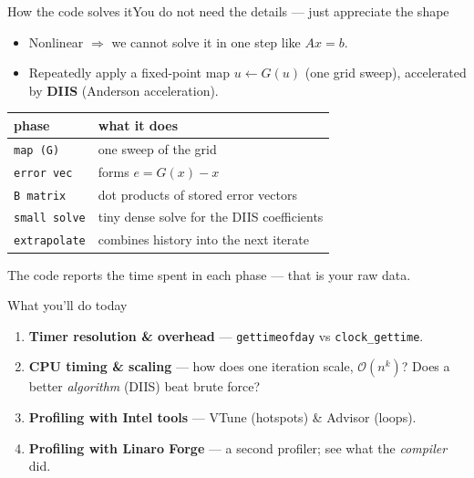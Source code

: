 \documentclass[aspectratio=169]{beamer}
\newcommand{\cplx}[1]{{\footnotesize\color{cookieMuted}#1}}
\begin{document}
\begin{frame}{How the code solves it}{You do not need the details --- just appreciate the shape}
  \begin{itemize}\setlength\itemsep{3pt}
    \item Nonlinear $\Rightarrow$ we cannot solve it in one step like $Ax = b$.
    \item Repeatedly apply a fixed-point map $u \leftarrow G(u)$ (one grid sweep),
      accelerated by \textbf{DIIS} (Anderson acceleration).
  \end{itemize}
  \medskip
  \begin{center}
    \begin{tabular}{@{}ll@{}}
      \toprule
      \textbf{phase} & \textbf{what it does} \\
      \midrule
      \texttt{map (G)}     & one sweep of the grid \\
      \texttt{error vec}   & forms $e = G(x) - x$ \\
      \texttt{B matrix}    & dot products of stored error vectors \\
      \texttt{small solve} & tiny dense solve for the DIIS coefficients \\
      \texttt{extrapolate} & combines history into the next iterate \\
      \bottomrule
    \end{tabular}
  \end{center}
  \medskip
  \cplx{The code reports the time spent in each phase --- that is your raw data.}
\end{frame}

\begin{frame}{What you'll do today}
  \begin{enumerate}\setlength\itemsep{6pt}
    \item \textbf{Timer resolution \& overhead} --- \texttt{gettimeofday} vs
      \texttt{clock\_gettime}.
    \item \textbf{CPU timing \& scaling} --- how does one iteration scale,
      $\mathcal{O}(n^{k})$? Does a better \emph{algorithm} (DIIS) beat brute force?
    \item \textbf{Profiling with Intel tools} --- VTune (hotspots) \& Advisor (loops).
    \item \textbf{Profiling with Linaro Forge} --- a second profiler; see what the
      \emph{compiler} did.
  \end{enumerate}
\end{frame}
\end{document}
